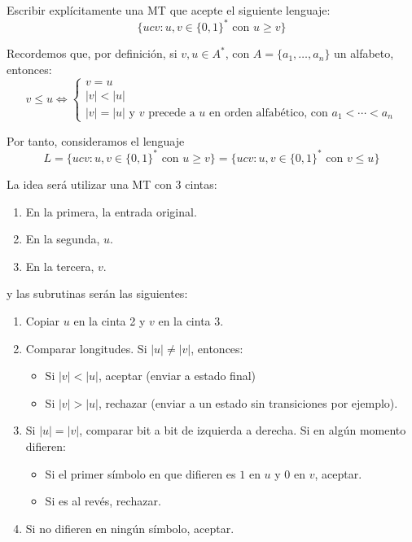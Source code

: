 \documentclass[12pt]{article}
\begin{document}
    \begin{ejercicio}
        Escribir explícitamente una MT que acepte el siguiente lenguaje:
        $$\{ucv : u,v \in \{0,1\}^* \text{ con } u \geq v\}$$ 

        Recordemos que, por definición, si $v, u \in A^*$, con $A = \{a_1, \ldots, a_n\}$ un alfabeto, entonces:
        $$v \leq u \iff \begin{cases}
            v = u \\
            |v| < |u| \\
            |v| = |u| \text{ y $v$ precede a $u$ en orden alfabético,
            con $a_1 < \cdots < a_n$}
        \end{cases}$$

        Por tanto, consideramos el lenguaje 
        $$L = \{ucv : u,v \in \{0,1\}^* \text{ con } u \geq v\} = 
        \{ucv : u,v \in \{0,1\}^* \text{ con } v \leq u\}$$

        La idea será utilizar una MT con 3 cintas:
        \begin{enumerate}
            \item En la primera, la entrada original.
            \item En la segunda, $u$.
            \item En la tercera, $v$.
        \end{enumerate}
        y las subrutinas serán las siguientes:
        \begin{enumerate}
            \item Copiar $u$ en la cinta 2 y $v$ en la cinta 3.
            \item Comparar longitudes. Si $|u| \neq |v|$, entonces:
            \begin{itemize}
                \item Si $|v| < |u|$, aceptar (enviar a estado final)
                \item Si $|v| > |u|$, rechazar (enviar a un estado sin transiciones por ejemplo).
            \end{itemize}
            \item Si $|u| = |v|$, comparar bit a bit de izquierda a derecha.
            Si en algún momento difieren:
            \begin{itemize}
                \item Si el primer símbolo en que difieren es $1$ en $u$
                y $0$ en $v$, aceptar.
                \item Si es al revés, rechazar.
            \end{itemize}
            \item Si no difieren en ningún símbolo, aceptar.
        \end{enumerate}



\end{ejercicio}
\end{document}
